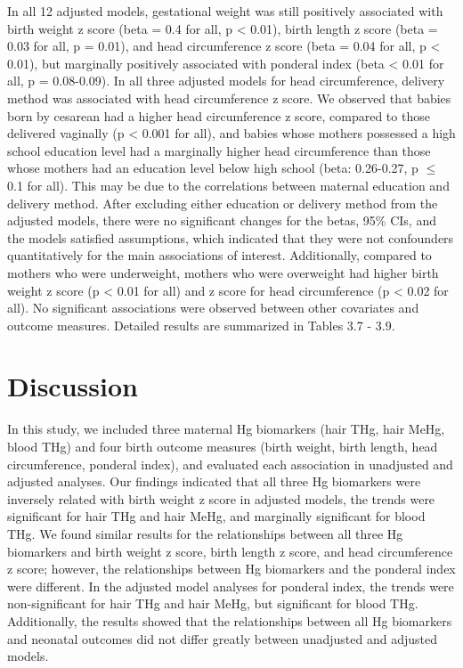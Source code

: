 In all 12 adjusted models, gestational weight was still positively associated with birth weight z score (beta = 0.4 for all, p < 0.01), birth length z score (beta = 0.03 for all, p = 0.01), and head circumference z score (beta = 0.04 for all, p < 0.01), but marginally positively associated with ponderal index (beta < 0.01 for all, p = 0.08-0.09). In all three adjusted models for head circumference, delivery method was associated with head circumference z score. We observed that babies born by cesarean had a higher head circumference z score, compared to those delivered vaginally (p < 0.001 for all), and babies whose mothers possessed a high school education level had a marginally higher head circumference than those whose mothers had an education level below high school (beta: 0.26-0.27, p ${\le}$ 0.1 for all). This may be due to the correlations between maternal education and delivery method. After excluding either education or delivery method from the adjusted models, there were no significant changes for the betas, 95\% CIs, and the models satisfied assumptions, which indicated that they were not confounders quantitatively for the main associations of interest. Additionally, compared to mothers who were underweight, mothers who were overweight had higher birth weight z score (p < 0.01 for all) and z score for head circumference (p < 0.02 for all). No significant associations were observed between other covariates and outcome measures. Detailed results are summarized in Tables 3.7 - 3.9.

\section{Discussion}

In this study, we included three maternal Hg biomarkers (hair THg, hair MeHg, blood THg) and four birth outcome measures (birth weight, birth length, head circumference, ponderal index), and evaluated each association in unadjusted and adjusted analyses. Our findings indicated that all three Hg biomarkers were inversely related with birth weight z score in adjusted models, the trends were significant for hair THg and hair MeHg, and marginally significant for blood THg. We found similar results for the relationships between all three Hg biomarkers and birth weight z score, birth length z score, and head circumference z score; however, the relationships between Hg biomarkers and the ponderal index were different. In the adjusted model analyses for ponderal index, the trends were non-significant for hair THg and hair MeHg, but significant for blood THg. Additionally, the results showed that the relationships between all Hg biomarkers and neonatal outcomes did not differ greatly between unadjusted and adjusted models.

